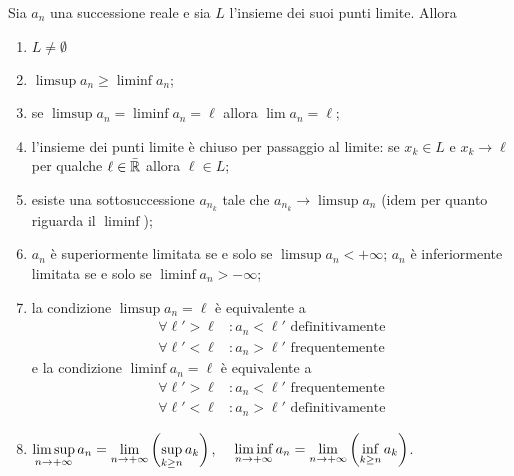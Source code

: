 \begin{theorem}
Sia $a_n$ una successione reale e sia $L$ l'insieme dei suoi punti
limite. Allora
\begin{enumerate}
  \item $L\neq \emptyset$

  \item $\limsup a_n \ge \liminf a_n$;

  \item se $\limsup a_n = \liminf a_n = \ell$ allora $\lim a_n = \ell$;

  \item
  l'insieme dei punti limite è chiuso per passaggio al limite:
  se $x_k\in L$ e $x_k \to \ell$ per qualche $\ell \in \bar {\mathbb R}$ allora $\ell \in L$;

  \item
  esiste una sottosuccessione $a_{n_k}$ tale che
  $a_{n_k} \to \limsup a_n$ (idem per quanto riguarda
  il $\liminf$);

  \item $a_n$ è superiormente limitata se e solo se $\limsup a_n < +\infty$;
  $a_n$ è inferiormente limitata se e solo se $\liminf a_n > -\infty$;

  \item la condizione
  $\limsup a_n = \ell$ è equivalente a
  \begin{align*}
   \forall \ell' > \ell &\colon a_n < \ell' \text{ definitivamente} \\
   \forall \ell' < \ell &\colon a_n > \ell' \text{ frequentemente}
  \end{align*}
  e la condizione $\liminf a_n = \ell$ è equivalente a
  \begin{align*}
  \forall \ell' > \ell &\colon a_n < \ell' \text{ frequentemente} \\
  \forall \ell' < \ell &\colon a_n > \ell' \text{ definitivamente}
  \end{align*}

  \item $\displaystyle \limsup_{n\to +\infty} a_n = \lim_{n\to +\infty} {\left( \sup_{k\ge n} a_k \right)}$,
  $\quad\displaystyle \liminf_{n\to +\infty} a_n = \lim_{n\to +\infty} {\left( \inf_{k\ge n} a_k \right)}$.

 \end{enumerate}
\end{theorem}
%
